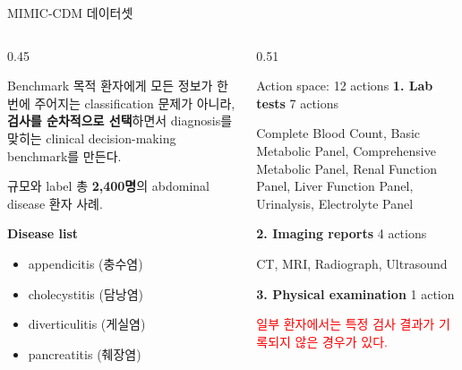 \documentclass[
11pt,notheorems,hyperref={pdfauthor=whatever}
]{beamer}
\begin{document}
\begin{frame}{MIMIC-CDM 데이터셋}
\vspace{0.15em}
\begin{columns}[T,onlytextwidth]
\begin{column}{0.45\textwidth}
\begin{block}{Benchmark 목적}
\small
환자에게 모든 정보가 한 번에 주어지는 classification 문제가 아니라, \textbf{검사를 순차적으로 선택}하면서 diagnosis를 맞히는 clinical decision-making benchmark를 만든다.
\end{block}

\vspace{0.35em}
\begin{block}{규모와 label}
\small
총 \textbf{2,400명}의 abdominal disease 환자 사례.

\vspace{0.35em}
\textbf{Disease list}
\begin{itemize}
\item appendicitis (충수염)
\item cholecystitis (담낭염)
\item diverticulitis (게실염)
\item pancreatitis (췌장염)
\end{itemize}
\end{block}
\end{column}

\begin{column}{0.51\textwidth}
\begin{block}{Action space: 12 actions}
\small
\textbf{1. Lab tests} \hfill {\footnotesize 7 actions}

\vspace{0.15em}
{\footnotesize
Complete Blood Count, Basic Metabolic Panel, Comprehensive Metabolic Panel, Renal Function Panel, Liver Function Panel, Urinalysis, Electrolyte Panel
}

\vspace{0.65em}
\textbf{2. Imaging reports} \hfill {\footnotesize 4 actions}

\vspace{0.15em}
{\footnotesize CT, MRI, Radiograph, Ultrasound}

\vspace{0.65em}
\textbf{3. Physical examination} \hfill {\footnotesize 1 action}

\vspace{1.0em}
{\footnotesize\textcolor{red}{일부 환자에서는 특정 검사 결과가 기록되지 않은 경우가 있다.}}
\end{block}
\end{column}
\end{columns}
\end{frame}
\end{document}
